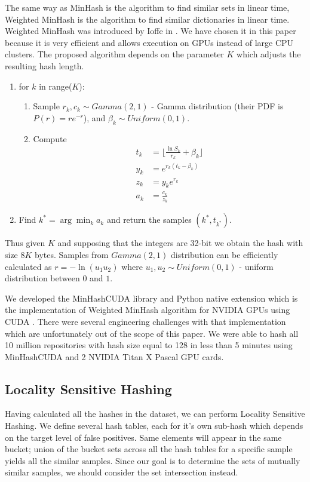 \documentclass[conference,10pt]{IEEEtran}
\begin{document}
The same way as MinHash is the algorithm to find similar sets in linear time, Weighted MinHash is the algorithm to find similar dictionaries in linear time. Weighted MinHash was introduced by Ioffe in \cite{Ioffe:2010:ICS:1933307.1934593}. We have chosen it in this paper because it is very efficient and allows execution on GPUs instead of large CPU clusters. The proposed algorithm depends on the parameter $K$ which adjusts the resulting hash length.

\begin{enumerate}[label=\arabic*.]
\item for $k$ in range($K$):
  \begin{enumerate}[label=1.\arabic*.]
  \item Sample $r_k, c_k \sim Gamma(2, 1)$ - Gamma distribution (their PDF is \mbox{$P(r)=re^{-r}$}), and
     $\beta_k \sim Uniform(0, 1)$.
  \item Compute
  \begin{align}
  t_ k &= \lfloor \frac{\ln S_k}{r_ k} + \beta_k\rfloor \\
  y_ k &= e^{r_k(t_k - \beta_k)} \\
  z_ k &= y_k e^{r_k} \\
  a_ k &= \frac{c_k}{z_k}
  \end{align}
  \end{enumerate}
\item Find $k^* = \arg\min_k a_k$ and return the samples $(k^*, t_{k^*})$.
\end{enumerate}

Thus given $K$ and supposing that the integers are 32-bit we obtain the hash
with size $8K$ bytes. Samples from $Gamma(2, 1)$ distribution can be efficiently calculated as $r = -\ln(u_1 u_2)$ where $u_1, u_2 \sim Uniform(0, 1)$ - uniform distribution between $0$ and $1$.

We developed the MinHashCUDA \cite{MHCUDA} library and Python native extension which is the implementation of Weighted MinHash algorithm for NVIDIA GPUs using CUDA \cite{Nickolls:2008:SPP:1365490.1365500}. There were several engineering challenges with that implementation which are unfortunately out of the scope of this paper. We were able to hash all 10 million repositories with hash size equal to 128 in less than 5 minutes using MinHashCUDA and 2 NVIDIA Titan X Pascal GPU cards.

\subsection{Locality Sensitive Hashing}
Having calculated all the hashes in the dataset, we can perform Locality Sensitive Hashing. We define several hash tables, each for it's own sub-hash which depends on the target level of false positives. Same elements will appear in the same bucket; union of the bucket sets across all the hash tables for a specific sample yields all the similar samples. Since our goal is to determine the sets of mutually similar samples, we should consider the set intersection instead.
\end{document}
